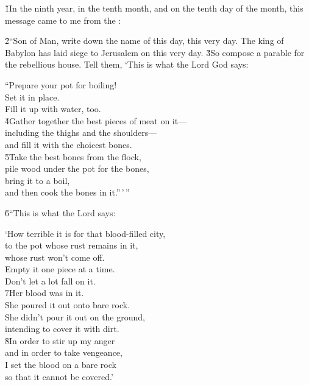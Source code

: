 \v{1}In the ninth year, in the tenth month, and on the tenth day of the month, this message came to me from the :

\v{2}``Son of Man, write down the name of this day, this very day. The king of Babylon has laid siege to Jerusalem on this very day. \v{3}So compose a parable for the rebellious house. Tell them, `This is what the Lord God says:

\begin{poetry}
\poeml ``Prepare your pot for boiling! \\
\poemll    Set it in place. \\
\poemlll       Fill it up with water, too. \\
\poeml \v{4}Gather together the best pieces of meat on it--- \\
\poemll    including the thighs and the shoulders--- \\
\poemlll       and fill it with the choicest bones. \\
\poeml \v{5}Take the best bones from the flock, \\
\poemll    pile wood under the pot for the bones, \\
\poeml bring it to a boil, \\
\poemll    and then cook the bones in it.''\,'\,''
\end{poetry}

\v{6}``This is what the Lord  says:

\begin{poetry}
\poeml `How terrible it is for that blood-filled city, \\
\poemll    to the pot whose rust remains in it, \\
\poemlll       whose rust won't come off. \\
\poeml Empty it one piece at a time. \\
\poemll    Don't let a lot fall on it. \\
\poeml \v{7}Her blood was in it. \\
\poemll    She poured it out onto bare rock. \\
\poeml She didn't pour it out on the ground, \\
\poemll    intending to cover it with dirt. \\
\poeml \v{8}In order to stir up my anger \\
\poemll    and in order to take vengeance, \\
\poeml I set the blood on a bare rock \\
\poemll    so that it cannot be covered.'
\end{poetry}

